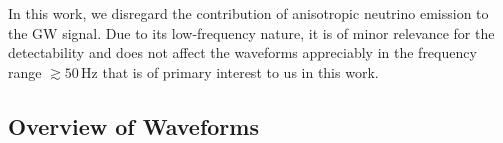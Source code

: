 
In this work, we disregard the contribution of anisotropic neutrino
emission \citep{epstein_78} to the GW signal. Due
to its low-frequency nature, it is of minor relevance for the
detectability and does not affect the waveforms appreciably
in the frequency range $\gtrsim 50 \, \mathrm{Hz}$ that is of
primary interest to us in this work.

\subsection{Overview of Waveforms}
